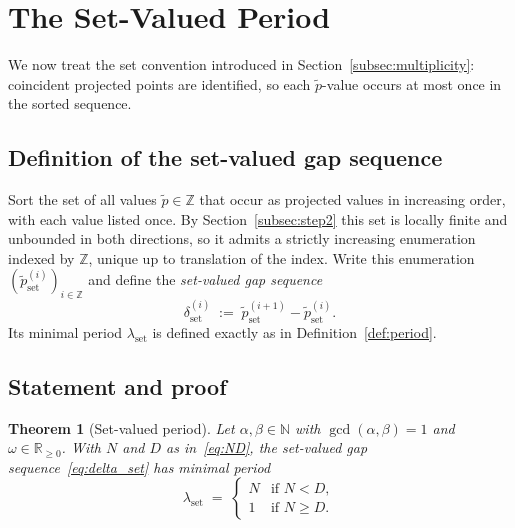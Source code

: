 \documentclass[11pt,reqno]{amsart}
\theoremstyle{plain}
\newtheorem{theorem}{Theorem}[section]
\theoremstyle{definition}
\theoremstyle{remark}
\begin{document}
\section{The Set-Valued Period}\label{sec:setvalued}

We now treat the set convention introduced in
Section~\ref{subsec:multiplicity}: coincident projected points are
identified, so each \(\tilde{p}\)-value occurs at most once in the sorted
sequence.

\subsection{Definition of the set-valued gap sequence}\label{subsec:setdef}

Sort the set of all values \(\tilde{p}\in\mathbb{Z}\) that occur as
projected values in increasing order, with each value listed once.
By Section~\ref{subsec:step2} this set is locally finite and unbounded in
both directions, so it admits a strictly increasing enumeration indexed by
\(\mathbb{Z}\), unique up to translation of the index.  Write this
enumeration \((\tilde{p}^{(i)}_{\mathrm{set}})_{i \in \mathbb{Z}}\) and
define the \emph{set-valued gap sequence}
\begin{equation}\label{eq:delta_set}
    \delta^{(i)}_{\mathrm{set}}
    \;:=\; \tilde{p}^{(i+1)}_{\mathrm{set}} - \tilde{p}^{(i)}_{\mathrm{set}}.
\end{equation}
Its minimal period \(\lambda_{\mathrm{set}}\) is defined exactly as in
Definition~\ref{def:period}.

\subsection{Statement and proof}

\begin{theorem}[Set-valued period]\label{thm:setperiod}
Let \(\alpha, \beta \in \mathbb{N}\) with \(\gcd(\alpha,\beta) = 1\) and
\(\omega \in \mathbb{R}_{\ge 0}\).  With \(N\) and \(D\) as
in~\eqref{eq:ND}, the set-valued gap sequence~\eqref{eq:delta_set}
has minimal period
\begin{equation}\label{eq:setformula}
    \lambda_{\mathrm{set}} \;=\;
    \begin{cases}
        N & \text{if } N < D, \\
        1 & \text{if } N \ge D.
    \end{cases}
\end{equation}
\end{theorem}
\end{document}

